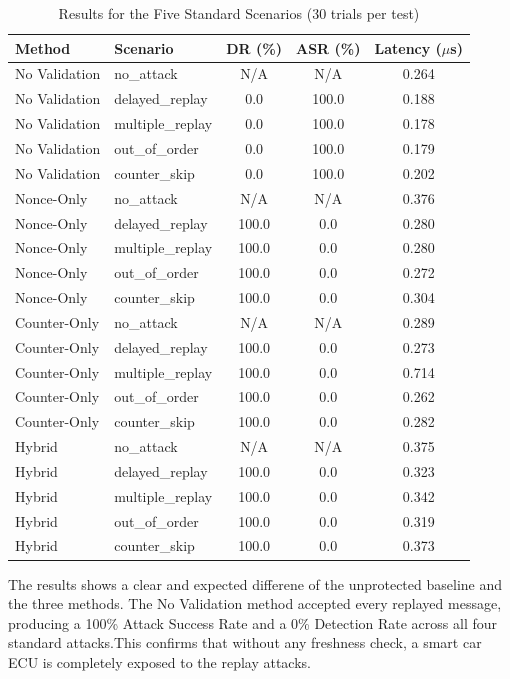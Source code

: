 \documentclass[a4paper,man,12pt]{article}
\begin{document}
\begin{table}[h]
\centering
\caption{Results for the Five Standard Scenarios (30 trials per test)}
\label{tab:results_standard}
\small
\begin{tabular}{|l|l|c|c|c|}
\hline
\textbf{Method} & \textbf{Scenario} & \textbf{DR (\%)} & \textbf{ASR (\%)} & \textbf{Latency ($\mu$s)} \\
\hline
No Validation & no\_attack       & N/A   & N/A   & 0.264 \\
No Validation & delayed\_replay  & 0.0   & 100.0 & 0.188 \\
No Validation & multiple\_replay & 0.0   & 100.0 & 0.178 \\
No Validation & out\_of\_order   & 0.0   & 100.0 & 0.179 \\
No Validation & counter\_skip    & 0.0   & 100.0 & 0.202 \\
\hline
Nonce-Only & no\_attack       & N/A   & N/A   & 0.376 \\
Nonce-Only & delayed\_replay  & 100.0 & 0.0   & 0.280 \\
Nonce-Only & multiple\_replay & 100.0 & 0.0   & 0.280 \\
Nonce-Only & out\_of\_order   & 100.0 & 0.0   & 0.272 \\
Nonce-Only & counter\_skip    & 100.0 & 0.0   & 0.304 \\
\hline
Counter-Only & no\_attack       & N/A   & N/A   & 0.289 \\
Counter-Only & delayed\_replay  & 100.0 & 0.0   & 0.273 \\
Counter-Only & multiple\_replay & 100.0 & 0.0   & 0.714 \\
Counter-Only & out\_of\_order   & 100.0 & 0.0   & 0.262 \\
Counter-Only & counter\_skip    & 100.0 & 0.0   & 0.282 \\
\hline
Hybrid & no\_attack       & N/A   & N/A   & 0.375 \\
Hybrid & delayed\_replay  & 100.0 & 0.0   & 0.323 \\
Hybrid & multiple\_replay & 100.0 & 0.0   & 0.342 \\
Hybrid & out\_of\_order   & 100.0 & 0.0   & 0.319 \\
Hybrid & counter\_skip    & 100.0 & 0.0   & 0.373 \\
\hline
\end{tabular}
\end{table}



The results shows a clear and expected differene of the unprotected baseline and the three methods. The No Validation method accepted every replayed message, producing a 100\% Attack Success Rate and a 0\% Detection Rate across all four standard attacks.This confirms that without any freshness check, a smart car ECU is completely exposed to the replay attacks.\\ 
\end{document}
